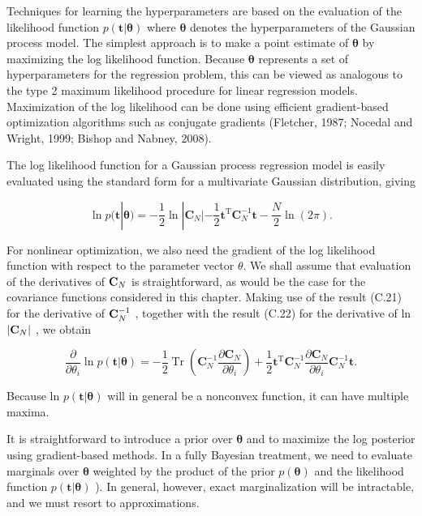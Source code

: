 \documentclass[
  10
]{article}
\begin{document}
Techniques for learning the hyperparameters are based on the evaluation
of the likelihood function
\(p ( \mathbf { t } | \boldsymbol { \theta } )\) where \(\pmb \theta\)
denotes the hyperparameters of the Gaussian process model. The simplest
approach is to make a point estimate of \(\pmb \theta\) by maximizing
the log likelihood function. Because \(\pmb \theta\) represents a set of
hyperparameters for the regression problem, this can be viewed as
analogous to the type 2 maximum likelihood procedure for linear
regression models. Maximization of the log likelihood can be done using
efficient gradient-based optimization algorithms such as conjugate
gradients (Fletcher, 1987; Nocedal and Wright, 1999; Bishop and Nabney,
2008).

The log likelihood function for a Gaussian process regression model is
easily evaluated using the standard form for a multivariate Gaussian
distribution, giving

\[
\ln p (\mathbf {t} | \boldsymbol {\theta}) = - \frac {1}{2} \ln | \mathbf {C} _ {N} | - \frac {1}{2} \mathbf {t} ^ {\mathrm{T}} \mathbf {C} _ {N} ^ {- 1} \mathbf {t} - \frac {N}{2} \ln (2 \pi).\tag{6.69}
\]

For nonlinear optimization, we also need the gradient of the log
likelihood function with respect to the parameter vector \(\theta .\) We
shall assume that evaluation of the derivatives of \({ \bf C } _ { N }\)
is straightforward, as would be the case for the covariance functions
considered in this chapter. Making use of the result (C.21) for the
derivative of \({ \bf C } _ { N } ^ { - 1 }\) , together with the result
(C.22) for the derivative of ln \(| { \bf C } _ { N } |\) , we obtain

\[
\frac {\partial}{\partial \theta_ {i}} \ln p (\mathbf {t} | \boldsymbol {\theta}) = - \frac {1}{2} \operatorname{Tr} \left(\mathbf {C} _ {N} ^ {- 1} \frac {\partial \mathbf {C} _ {N}}{\partial \theta_ {i}}\right) + \frac {1}{2} \mathbf {t} ^ {\mathrm{T}} \mathbf {C} _ {N} ^ {- 1} \frac {\partial \mathbf {C} _ {N}}{\partial \theta_ {i}} \mathbf {C} _ {N} ^ {- 1} \mathbf {t}.\tag{6.70}
\]

Because ln \(p ( \mathbf { t } | \mathbf { \boldsymbol { \theta } } )\)
will in general be a nonconvex function, it can have multiple maxima.

It is straightforward to introduce a prior over \(\pmb \theta\) and to
maximize the log posterior using gradient-based methods. In a fully
Bayesian treatment, we need to evaluate marginals over \(\pmb \theta\)
weighted by the product of the prior \(p ( \pmb \theta )\) and the
likelihood function \(p ( \mathbf { t } | \boldsymbol { \theta } )\) ).
In general, however, exact marginalization will be intractable, and we
must resort to approximations.
\end{document}
